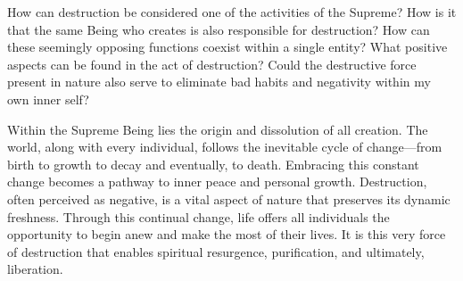 \newpage
\begin{mananam}{}
\normalfont\mananamtext How can destruction be considered one of the activities of the Supreme? How is it that the same Being who creates is also responsible for destruction? How can these seemingly opposing functions coexist within a single entity?
What positive aspects can be found in the act of destruction? Could the destructive force present in nature also serve to eliminate bad habits and negativity within my own inner self?
\end{mananam}
\sreflect
\begin{inspiration}{}
\normalfont\mananamtext Within the Supreme Being lies the origin and dissolution of all creation. The world, along with every individual, follows the inevitable cycle of change—from birth to growth to decay and eventually, to death. Embracing this constant change becomes a pathway to inner peace and personal growth.
Destruction, often perceived as negative, is a vital aspect of nature that preserves its dynamic freshness. Through this continual change, life offers all individuals the opportunity to begin anew and make the most of their lives. It is this very force of destruction that enables spiritual resurgence, purification, and ultimately, liberation.
\end{inspiration}
\newpage

